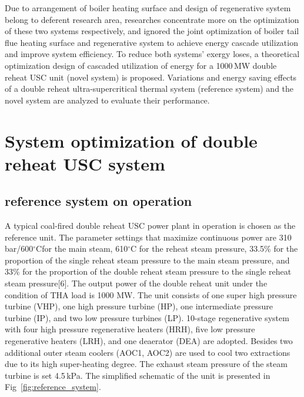 \documentclass[preprint,12pt]{elsarticle}
\begin{document}
Due to arrangement of boiler heating surface and design of regenerative system belong to deferent research area, researches concentrate more on the optimization of these two systems respectively, and ignored the joint optimization of boiler tail flue heating surface and regenerative system to achieve energy cascade utilization and improve system efficiency.
To reduce both systems' exergy loses, a theoretical optimization design of cascaded utilization of energy for a 1000\,MW double reheat USC unit (novel system) is proposed. Variations and energy saving effects of a double reheat ultra-supercritical thermal system (reference system) and the novel system are analyzed to evaluate their performance. 

\section{System optimization of double reheat USC system}
\label{sec2:system intro}
\subsection{reference system on operation} %
\label{sub2:ref intro}
A typical coal-fired double reheat USC power plant in operation is chosen as the reference unit.
The parameter settings that maximize continuous power are 310\,bar/600$^\circ$Cfor the main steam, 610$^\circ$C for the reheat steam pressure, 33.5\% for the proportion of the single reheat steam pressure to the main steam pressure, and 33\% for the proportion of the double reheat steam pressure to the single reheat steam pressure[6].
The output power of the double reheat unit under the condition of THA load is 1000 MW.
The unit consists of one super high pressure turbine (VHP), one high pressure turbine (HP), one intermediate pressure turbine (IP), and two low pressure turbines (LP).
10-stage regenerative system with four high pressure regenerative heaters (HRH), five low pressure regenerative heaters (LRH), and one deaerator (DEA) are adopted.
Besides two additional outer steam coolers (AOC1, AOC2) are used to cool two extractions due to its high super-heating degree. The exhaust steam pressure of the steam turbine is set 4.5\,kPa. The simplified schematic of the unit is presented in Fig~\ref{fig:reference_system}.
\end{document}
